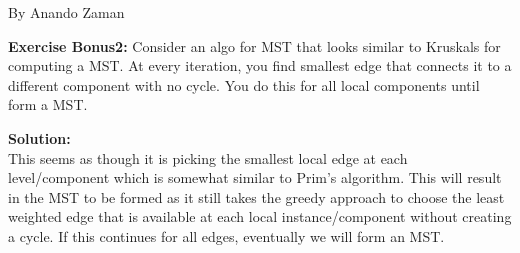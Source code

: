 \documentclass[11pt,fleqn]{article}
\begin{document}
By Anando Zaman


\textbf{Exercise Bonus2:} Consider an algo for MST that looks similar to Kruskals for computing a MST. At every iteration, you find smallest edge that connects it to a different component with no cycle. You do this for all local components until form a MST.\

\textbf{Solution:}\\
This seems as though it is picking the smallest local edge at each level/component which is somewhat similar to Prim's algorithm. This will result in the MST to be formed as it still  takes the greedy approach to choose the least weighted edge that is available at each local instance/component without creating a cycle. If this continues for all edges, eventually we will form an MST.

	
\end{document}
